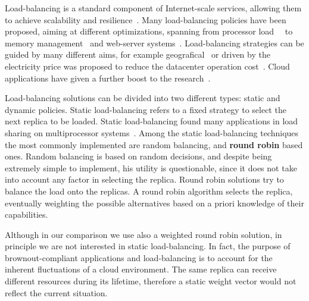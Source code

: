 Load-balancing is a standard component of Internet-scale services,
allowing them to achieve scalability and
resilience~\citep{Barroso09,Hamilton07:LISA}.  Many load-balancing
policies have been proposed, aiming at different optimizations,
spanning from processor load~~\cite{Stankovic:TC} to memory
management~\cite{PattersonMemoryLB,MemoryLBACC} and web-server
systems~\cite{Cardellini2003}. Load-balancing strategies can be guided
by many different aims, for example geografical~\cite{GeograficalSASO}
or driven by the electricity price was proposed to reduce the
datacenter operation
cost~\cite{LoadBalancingForElectricity:TCC}. Cloud applications have
given a further boost to the
research~\citep{Barroso09,Lu11:PerfEval,Lin12:IGCC}.


Load-balancing solutions can be divided into two different types:
static and dynamic policies. Static load-balancing refers to a fixed
strategy to select the next replica to be loaded. Static
load-balancing found many applications in load sharing on
multiprocessor
systems~\cite{StaticLoadBalancing:TSE,StaticOptimal:ACM}. Among the
static load-balancing techniques the most commonly implemented are
random balancing, and \textbf{round robin} based ones. Random
balancing is based on random decisions, and despite being extremely
simple to implement, his utility is questionable, since it does not
take into account any factor in selecting the replica. Round robin
solutions try to balance the load onto the replicas. A round robin
algorithm selects the replica, eventually weighting the possible
alternatives based on a priori knowledge of their capabilities.

Although in our comparison we use also a weighted round robin
solution, in principle we are not interested in static
load-balancing. In fact, the purpose of brownout-compliant
applications and load-balancing is to account for the inherent
fluctuations of a cloud environment. The same replica can receive
different resources during its lifetime, therefore a static weight
vector would not reflect the current situation.


